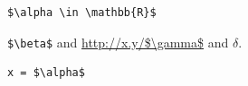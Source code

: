 \begin{verbatim}
$\alpha \in \mathbb{R}$
\end{verbatim}
\verb|$\beta$| and \url{http://x.y/$\gamma$} and $\delta$.
\begin{lstlisting}
x = $\alpha$
\end{lstlisting}
